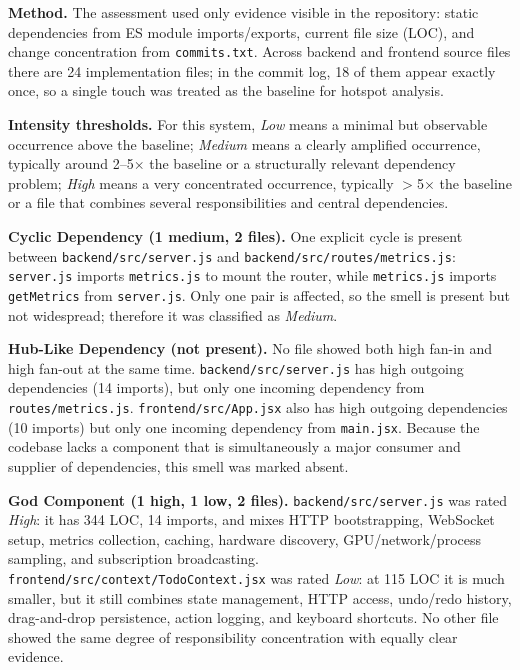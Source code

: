 \textbf{Method.} The assessment used only evidence visible in the repository: static dependencies from ES module imports/exports, current file size (LOC), and change concentration from \texttt{commits.txt}. Across backend and frontend source files there are 24 implementation files; in the commit log, 18 of them appear exactly once, so a single touch was treated as the baseline for hotspot analysis.

\textbf{Intensity thresholds.} For this system, \emph{Low} means a minimal but observable occurrence above the baseline; \emph{Medium} means a clearly amplified occurrence, typically around 2--5$\times$ the baseline or a structurally relevant dependency problem; \emph{High} means a very concentrated occurrence, typically $>$5$\times$ the baseline or a file that combines several responsibilities and central dependencies.

\textbf{Cyclic Dependency (1 medium, 2 files).} One explicit cycle is present between \texttt{backend/src/server.js} and \texttt{backend/src/routes/metrics.js}: \texttt{server.js} imports \texttt{metrics.js} to mount the router, while \texttt{metrics.js} imports \texttt{getMetrics} from \texttt{server.js}. Only one pair is affected, so the smell is present but not widespread; therefore it was classified as \emph{Medium}.

\textbf{Hub-Like Dependency (not present).} No file showed both high fan-in and high fan-out at the same time. \texttt{backend/src/server.js} has high outgoing dependencies (14 imports), but only one incoming dependency from \texttt{routes/metrics.js}. \texttt{frontend/src/App.jsx} also has high outgoing dependencies (10 imports) but only one incoming dependency from \texttt{main.jsx}. Because the codebase lacks a component that is simultaneously a major consumer and supplier of dependencies, this smell was marked absent.

\textbf{God Component (1 high, 1 low, 2 files).} \texttt{backend/src/server.js} was rated \emph{High}: it has 344 LOC, 14 imports, and mixes HTTP bootstrapping, WebSocket setup, metrics collection, caching, hardware discovery, GPU/network/process sampling, and subscription broadcasting. \texttt{frontend/src/context/TodoContext.jsx} was rated \emph{Low}: at 115 LOC it is much smaller, but it still combines state management, HTTP access, undo/redo history, drag-and-drop persistence, action logging, and keyboard shortcuts. No other file showed the same degree of responsibility concentration with equally clear evidence.

